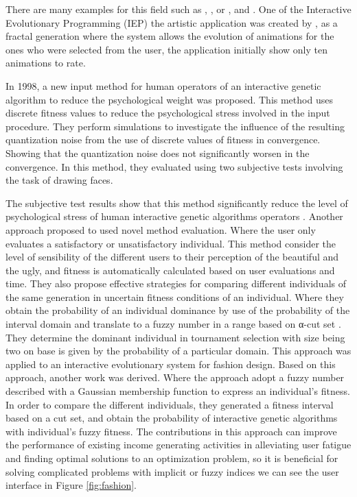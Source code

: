 There are many examples for this field such as
\cite{mckenna1990dynamic},
\cite{ventrella1994explorations}, or
\cite{ventrella1995disney}, \cite{lim1999pro} and
\cite{lim2000solve}. One of the Interactive Evolutionary Programming
(IEP) the artistic application was created by \cite{angeline1996evolving}, as a
fractal generation where the system allows the evolution of animations for the
ones who were selected from the user, the application initially show only ten
animations to rate.


In 1998, a new input method for human operators of an interactive genetic
algorithm to reduce the psychological weight was proposed. This method uses
discrete fitness values to reduce the psychological stress involved in the input
procedure. They perform simulations to investigate the influence of the
resulting quantization noise from the use of discrete values of fitness in
convergence. Showing that the quantization noise does not significantly worsen
in the convergence. In this method, they evaluated using two subjective tests
involving the task of drawing faces.


The subjective test results show that this method significantly reduce the level
of psychological stress of human interactive genetic algorithms operators
\cite{ohsaki1998input}. Another approach proposed to used novel method
evaluation. Where the user only evaluates a satisfactory or unsatisfactory
individual. This method consider the level of sensibility of the different users
to their perception of the beautiful and the ugly, and fitness is automatically
calculated based on user evaluations and time. They also propose effective
strategies for comparing different individuals of the same generation in
uncertain fitness conditions of an individual. Where they obtain the probability
of an individual dominance by use of the probability of the interval domain and
translate to a fuzzy number in a range based on α-cut set \cite{gong2009impact}.
They determine the dominant individual in tournament selection with size being
two on base is given by the probability of a particular domain. This approach
was applied to an interactive evolutionary system for fashion design. Based on this approach,
another work was derived. Where the approach adopt a fuzzy number described
with a Gaussian membership function to express an individual's fitness. In order
to compare the different individuals, they generated a fitness interval based on
a cut set, and obtain the probability of interactive genetic algorithms with
individual's fuzzy fitness. The contributions in this approach can improve the
performance of existing income generating activities in alleviating user fatigue
and finding optimal solutions to an optimization problem, so it is beneficial
for solving complicated problems with implicit or fuzzy indices
\cite{gong2011interactive} we can see the user interface in Figure
\ref{fig:fashion}.

